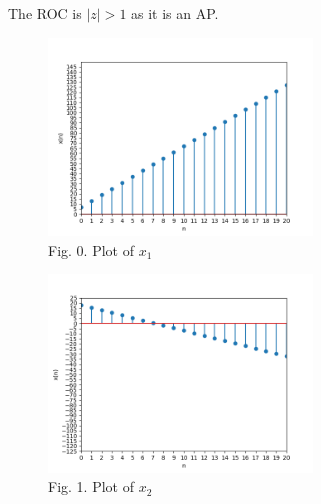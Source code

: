 \documentclass[journal,12pt,twocolumn]{IEEEtran}
\theoremstyle{remark}
\begin{document}
The ROC is $|z|>1$ as it is an AP.

\begin{figure}[!ht]
    \begin{center}
    \includegraphics[width = 7cm]{Figure_1}\\
    Fig. 0. Plot of $x_1$ \\
    \end{center}
\end{figure}
 
\begin{figure}[!ht]
    \begin{center}
    \includegraphics[width = 7cm]{Figure_2}\\
    Fig. 1. Plot of $x_2$ \\
    \end{center}
\end{figure}
\end{document}
